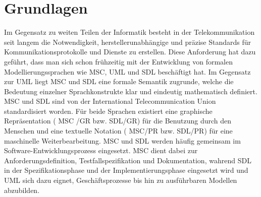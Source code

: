 \chapter{Grundlagen}
\label{ch:Grundlagen}
Im Gegensatz zu weiten Teilen der Informatik besteht in der Telekommunikation seit langem die Notwendigkeit, herstellerunabhängige und präzise Standards für Kommunikationsprotokolle und Dienste zu erstellen. Diese Anforderung hat dazu geführt, dass man sich schon frühzeitig mit der Entwicklung von formalen Modellierungssprachen wie \ac{MSC}, \ac{UML} und \ac{SDL} beschäftigt hat. Im Gegensatz zur \ac{UML} liegt \ac{MSC} und \ac{SDL} eine formale Semantik zugrunde, welche die Bedeutung einzelner Sprachkonstrukte klar und eindeutig mathematisch definiert.
\ac{MSC} und \ac{SDL} sind von der International Telecommunication Union standardisiert worden. Für beide Sprachen existiert eine graphische Repräsentation ( \ac{MSC} /GR bzw.  \ac{SDL}/GR) für die Benutzung durch den Menschen und eine textuelle Notation ( \ac{MSC}/PR bzw. \ac{SDL}/PR) für eine maschinelle Weiterbearbeitung. \ac{MSC}  und \ac{SDL}  werden häufig gemeinsam im Software-Entwicklungsprozess eingesetzt. \ac{MSC} dient dabei zur Anforderungsdefinition, Testfallspezifikation und Dokumentation, wahrend  \ac{SDL} in der Spezifikationsphase und der Implementierungsphase eingesetzt wird und \ac{UML} sich dazu eignet, Geschäftsprozesse bis hin zu ausführbaren Modellen abzubilden.




